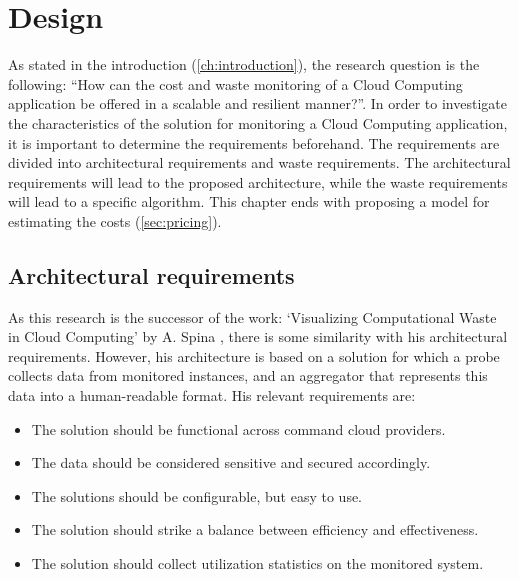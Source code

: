 \chapter{Design}\label{ch:design} %
As stated in the introduction (\autoref{ch:introduction}), the research question is the following: ``How can the cost and waste monitoring of a Cloud Computing application be offered in a scalable and resilient manner?''. In order to investigate the characteristics of the solution for monitoring a Cloud Computing application, it is important to determine the requirements beforehand. The requirements are divided into architectural requirements and waste requirements. The architectural requirements will lead to the proposed architecture, while the waste requirements will lead to a specific algorithm. This chapter ends with proposing a model for estimating the costs (\autoref{sec:pricing}).

\section{Architectural requirements} \label{sec:architectural_req}
As this research is the successor of the work: `Visualizing Computational Waste in Cloud Computing' by A. Spina \cite{spina}, there is some similarity with his architectural requirements. However, his architecture is based on a solution for which a probe collects data from monitored instances, and an aggregator that represents this data into a human-readable format. His relevant requirements are:
\begin{itemize}
    \item The solution should be functional across command cloud providers.
    \item The data should be considered sensitive and secured accordingly.
    \item The solutions should be configurable, but easy to use.
    \item The solution should strike a balance between efficiency and effectiveness.
    \item The solution should collect utilization statistics on the monitored system. 
\end{itemize}

